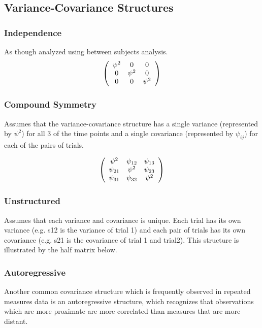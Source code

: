 \documentclass[12pt, a4paper]{article}
\begin{document}
\subsection{Variance-Covariance Structures}

\subsubsection{Independence}

As though analyzed using between subjects analysis.
\[
\left(
\begin{array}{c c c}
  \psi^2 & 0 & 0   \\
  0 & \psi^2 & 0   \\
  0 & 0 & \psi^2   \\
\end{array}%
\right)
\]


\subsubsection{Compound Symmetry}

Assumes that the variance-covariance structure has a single variance (represented by $\psi^2$)
for all 3 of the time points and a single covariance (represented by $\psi_{ij}$) for each of the pairs of trials.

\[
\left(%
\begin{array}{c c c}
  \psi^2 &  \psi_{12} & \psi_{13}   \\
  \psi_{21} & \psi^2 & \psi_{23}   \\
  \psi_{31} & \psi_{32} & \psi^2   \\
\end{array}%
\right)
\]


\subsubsection{Unstructured}

Assumes that each variance and covariance is unique.
Each trial has its own variance (e.g. s12 is the variance of trial 1)
and each pair of trials has its own covariance (e.g. s21 is the covariance of trial 1 and trial2).
This structure is illustrated by the half matrix below.


\subsubsection{Autoregressive}

Another common covariance structure which is frequently observed
in repeated measures data is an autoregressive structure,
which recognizes that observations which are more proximate
are more correlated than measures that are more distant.
\end{document}
